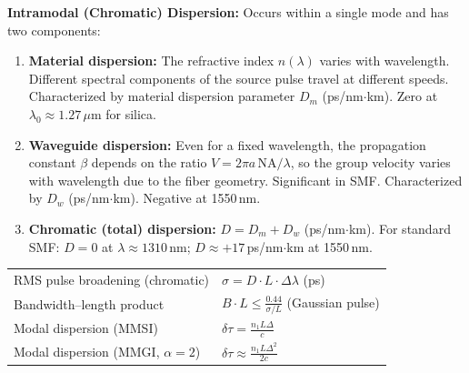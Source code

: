 \documentclass[12pt,a4paper]{article}
\renewcommand{\arraystretch}{1.45}
\begin{document}
\textbf{Intramodal (Chromatic) Dispersion:} Occurs within a single mode and has two components:
\begin{enumerate}[leftmargin=*, itemsep=3pt, label=\textbf{\arabic*.}]
  \item \textbf{Material dispersion:} The refractive index $n(\lambda)$ varies with wavelength. Different spectral components of the source pulse travel at different speeds. Characterized by material dispersion parameter $D_m$ (ps/nm$\cdot$km). Zero at $\lambda_0 \approx 1.27\,\mu$m for silica.
  \item \textbf{Waveguide dispersion:} Even for a fixed wavelength, the propagation constant $\beta$ depends on the ratio $V = 2\pi a\,\text{NA}/\lambda$, so the group velocity varies with wavelength due to the fiber geometry. Significant in SMF. Characterized by $D_w$ (ps/nm$\cdot$km). Negative at 1550\,nm.
  \item \textbf{Chromatic (total) dispersion:} $D = D_m + D_w$ (ps/nm$\cdot$km). For standard SMF: $D = 0$ at $\lambda \approx 1310\,$nm; $D \approx +17\,$ps/nm$\cdot$km at 1550\,nm.
\end{enumerate}

\begin{tcolorbox}[formulabox, title={\textbf{Dispersion Formulas}}]
\renewcommand{\arraystretch}{1.55}
\begin{tabularx}{\linewidth}{B{4.5cm} X}
RMS pulse broadening (chromatic) & $\sigma = D \cdot L \cdot \Delta\lambda$ \quad (ps) \\[4pt]
Bandwidth--length product & $B \cdot L \leq \displaystyle\frac{0.44}{\sigma/L}$ (Gaussian pulse) \\[6pt]
Modal dispersion (MMSI) & $\delta\tau = \displaystyle\frac{n_1 L \Delta}{c}$ \\[6pt]
Modal dispersion (MMGI, $\alpha{=}2$) & $\delta\tau \approx \displaystyle\frac{n_1 L \Delta^2}{2c}$ \\[6pt]
\end{tabularx}
\end{tcolorbox}
\end{document}
